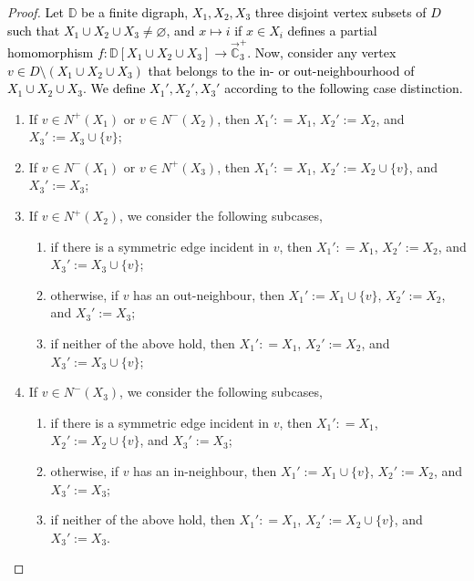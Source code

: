 \documentclass{article}
\theoremstyle{definition}
\theoremstyle{remark}
\newcommand{\blue}[1]{\textcolor{black}{#1}}
\newcommand{\bC}{{\mathbb C}}
\newcommand{\bD}{{\mathbb D}}
\begin{document}
\begin{proof}
    \blue{Let $\bD$ be  a finite digraph, $X_1,X_2,X_3$ three disjoint vertex subsets
    of $D$ such that $X_1\cup X_2 \cup X_3\neq \varnothing$, and $x\mapsto i$
    if $x\in X_i$ defines a partial homomorphism $f\colon\bD[X_1\cup X_2\cup X_3]\to \vec{\bC}_3^+$.
    Now, consider any vertex $v\in D\setminus (X_1\cup X_2\cup X_3)$ that belongs
    to the in- or out-neighbourhood of $X_1\cup X_2\cup X_3$. We define $X_1',X_2',X_3'$
    according to the following case distinction.}
\begin{enumerate}
    \item If $v\in N^+(X_1)$ or $v\in N^-(X_2)$, then $X_1': = X_1$, $X_2':=X_2$, and $X_3':= X_3\cup \{v\}$;
    \item If $v\in N^-(X_1)$ or $v\in N^+(X_3)$, then $X_1': = X_1$, $X_2':=X_2\cup\{v\}$, and $X_3':= X_3$;
    \item If $v\in N^+(X_2)$, we consider the following subcases,
        \begin{enumerate}
            \item if there is a symmetric edge incident in $v$, then $X_1': = X_1$, $X_2':=X_2$, and $X_3':= X_3\cup \{v\}$;
            \item otherwise, if $v$ has an out-neighbour, then $X_1':= X_1\cup \{v\}$, $X_2':=X_2$,  and $X_3':= X_3$;
            \item if neither of the above hold, then $X_1': = X_1$, $X_2':=X_2$, and $X_3':= X_3\cup \{v\}$;
        \end{enumerate}
    \item If $v\in N^-(X_3)$, we consider the following subcases,
        \begin{enumerate}
            \item if there is a symmetric edge incident in $v$, then $X_1': = X_1$, $X_2':=X_2\cup\{v\}$, and $X_3':= X_3$;
            \item otherwise, if $v$ has an in-neighbour, then $X_1':= X_1\cup \{v\}$, $X_2':=X_2$,  and $X_3':= X_3$;
            \item if neither of the above hold, then $X_1': = X_1$, $X_2':=X_2 \cup\{v\}$, and $X_3':= X_3$.
        \end{enumerate}
\end{enumerate}


\end{proof}
\end{document}
